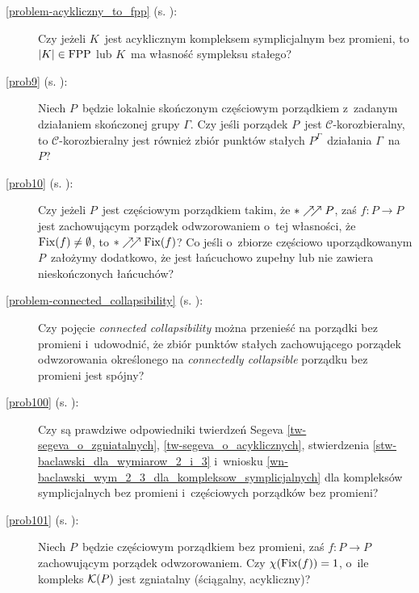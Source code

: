 \begin{description}
\item[\ref{problem-acykliczny_to_fpp} \normalfont (s. \pageref{problem-acykliczny_to_fpp}):] Czy jeżeli $K$~jest acyklicznym kompleksem symplicjalnym bez promieni, to $|K|\in\mathrm{FPP}$ lub $K$~ma własność sympleksu stałego?


\item[\ref{prob9} \normalfont (s. \pageref{prob9}):] Niech $P$~będzie lokalnie skończonym częściowym porządkiem z~zadanym działaniem skończonej grupy $\Gamma$. Czy jeśli porządek $P$~jest \mbox{$\mathcal{C}$-korozbieralny}, to \mbox{$\mathcal{C}$-korozbieralny} jest również zbiór punktów stałych $P^\Gamma$~działania $\Gamma$~na~$P$?

\item[\ref{prob10} \normalfont (s. \pageref{prob10}):] Czy jeżeli $P$~jest częściowym porządkiem takim, że $*\nearrow\!\!\nearrow P$, zaś $f\colon P\to P$ jest zachowującym porządek odwzorowaniem o~tej własności, że $\operatorname{Fix}(f)\not=\emptyset$, to $*\nearrow\!\!\nearrow \operatorname{Fix}(f)$? Co jeśli o~zbiorze częściowo uporządkowanym $P$~założymy dodatkowo, że jest łańcuchowo zupełny lub nie zawiera nieskończonych łańcuchów?

\item[\ref{problem-connected_collapsibility} \normalfont (s. \pageref{problem-connected_collapsibility}):] Czy pojęcie \textit{connected collapsibility} można przenieść na porządki bez promieni i~udowodnić, że zbiór punktów stałych zachowującego porządek odwzorowania określonego na \textit{connectedly collapsible} porządku bez promieni jest spójny?

\item[\ref{prob100} \normalfont (s. \pageref{prob100}):] Czy są prawdziwe odpowiedniki twierdzeń Segeva \ref{tw-segeva_o_zgniatalnych}, \ref{tw-segeva_o_acyklicznych}, stwierdzenia \ref{stw-baclawski_dla_wymiarow_2_i_3} i~wniosku \ref{wn-baclawski_wym_2_3_dla_kompleksow_symplicjalnych} dla kompleksów symplicjalnych bez promieni i~częściowych porządków bez promieni?

\item[\ref{prob101} \normalfont (s. \pageref{prob101}):] Niech $P$~będzie częściowym porządkiem bez promieni, zaś $f\colon P\to P$ zachowującym porządek odwzorowaniem. Czy $\chi(\operatorname{Fix}(f))=1$, o~ile kompleks $\mathcal{K}(P)$ jest zgniatalny (ściągalny, acykliczny)?
\end{description}
\newpage\thispagestyle{empty}
